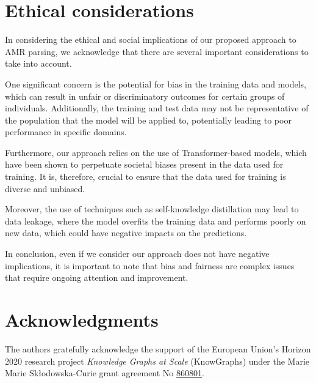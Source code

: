 \documentclass[11pt]{article}
\begin{document}
\section{Ethical considerations}

In considering the ethical and social implications of our proposed approach to AMR parsing, we acknowledge that there are several important considerations to take into account.

One significant concern is the potential for bias in the training data and models, which can result in unfair or discriminatory outcomes for certain groups of individuals. Additionally, the training and test data may not be representative of the population that the model will be applied to, potentially leading to poor performance in specific domains.

Furthermore, our approach relies on the use of Transformer-based models, which have been shown to perpetuate societal biases present in the data used for training. It is, therefore, crucial to ensure that the data used for training is diverse and unbiased.

Moreover, the use of techniques such as self-knowledge distillation may lead to data leakage, where the model overfits the training data and performs poorly on new data, which could have negative impacts on the predictions.

In conclusion, even if we consider our approach does not have negative implications, it is important to note that bias and fairness are complex issues that require ongoing attention and improvement.

\section*{Acknowledgments}

\begin{center}
\noindent
\begin{minipage}{0.1\linewidth}

\end{minipage}
\hspace{0.005\linewidth}
\begin{minipage}{0.72\linewidth}
The authors gratefully acknowledge the support of the European Union’s Horizon 2020 research project \textit{Knowledge Graphs at Scale} (KnowGraphs) under the Marie  Marie Sk\l{}odowska-Curie grant agreement No \href{https://cordis.europa.eu/project/id/860801}{860801}.


  \vspace{1ex}
\end{minipage}
\hspace{0.005\linewidth}
\begin{minipage}{0.1\linewidth}
  \vspace{0.05cm}
\vspace{0.05cm}
\end{minipage}\\
\end{center}
\end{document}
